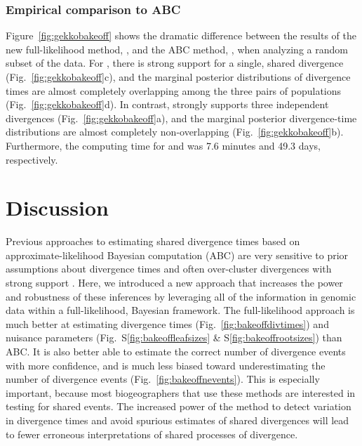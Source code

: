\subsubsection{Empirical comparison to ABC}

Figure~\ref{fig:gekkobakeoff} shows the dramatic difference between the results
of the new full-likelihood method, \ecoevolity, and the ABC method,
\dppmsbayes, when analyzing a random subset of the  data.
For \dppmsbayes, there is strong support for a single, shared divergence
(Fig.~\ref{fig:gekkobakeoff}c),
and the marginal posterior distributions of divergence times are almost
completely overlapping among the three pairs of populations
(Fig.~\ref{fig:gekkobakeoff}d).
In contrast,
\ecoevolity strongly supports three independent divergences
(Fig.~\ref{fig:gekkobakeoff}a),
and the marginal posterior divergence-time distributions are almost completely
non-overlapping
(Fig.~\ref{fig:gekkobakeoff}b).
Furthermore, the computing time for \ecoevolity and \dppmsbayes was 7.6
minutes and 49.3 days, respectively.

\ifembed{

}{}


\section{Discussion}

Previous approaches to estimating shared divergence times based on
approximate-likelihood Bayesian computation (ABC) are very sensitive to prior
assumptions about divergence times and often over-cluster divergences with
strong support
\citep{Oaks2012,Hickerson2013,Oaks2014reply,Oaks2014dpp}.
Here, we introduced a new approach that increases the power and robustness of
these inferences by leveraging all of the information in genomic data within a
full-likelihood, Bayesian framework.
The full-likelihood approach is much better at estimating
divergence times
(Fig.~\ref{fig:bakeoffdivtimes})
and nuisance parameters
(Fig.\ S\ref{fig:bakeoffleafsizes} \& S\ref{fig:bakeoffrootsizes})
than ABC.
It is also better able to estimate the correct number of divergence events with
more confidence, and is much less biased toward underestimating the number of
divergence events
(Fig.~\ref{fig:bakeoffnevents}).
This is especially important, because most biogeographers that use these
methods are interested in testing for shared events.
The increased power of the method to detect variation in divergence times and
avoid spurious estimates of shared divergences will lead to fewer erroneous
interpretations of shared processes of divergence.

